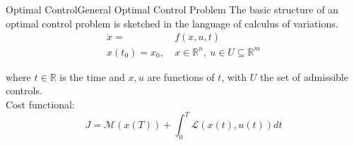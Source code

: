 
\begin{frame}{Optimal Control}{General Optimal Control Problem}
	The basic structure of an optimal control problem is sketched in the language of calculus of variations.
	\begin{align}
		\dot{x} = &f(x,u,t) \label{eq:BasicOptimalFunction} \\ 
		x(t_0) = x_0, \ &x \in \mathbb{R}^n, \ u \in U \subseteq \mathbb{R}^m \label{eq:BasicOptimalDefinitions}
	\end{align}
	
	where $t \in \mathbb{R}$ is the time and $x,u$ are functions of $t$, with $U$ the set of admissible controls. \\
	\medskip
	Cost functional:
	\begin{equation}\label{eq:BolzaProblem}
		J = \mathcal{M}(x(T)) + \int_{0}^{T} \mathcal{L}(x(t),u(t)) dt
	\end{equation} 
\end{frame}

%
%	
%	
%	

